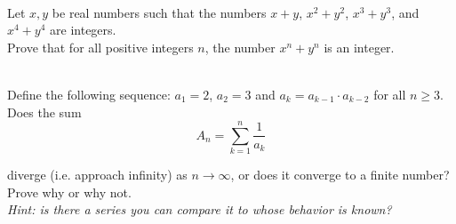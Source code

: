 \documentclass[11pt]{article}
\newif\ifsolutions
\begin{document}
\begin{qunlist}
\begin{itemize}
\ifsolutions
\textcolor{blue}{
\textbf{Solutions:} 
}
\fi

\end{itemize}



 \\
Let $x,y$ be real numbers such that the numbers $x+y$, $x^2+y^2$, $x^3+y^3$, and $x^4+y^4$ are integers. \\ 
Prove that for all positive integers $n$, the number $x^n + y^n$ is an integer.

\ifsolutions
\textbf{Solutions:}
Use strong induction. Use the identity
\[ x^{k+1} + y^{k+1} = (x+y)(x^k + y^k) - xy(x^{k-1} + y^{k-1}) \]

We are given that $x+y$ is an integer, and by our inductive hypothesis $x^k + y^k$ and $x^{k-1} + y^{k-1}$ 
are also both integers. So we need to show that $xy$ is an integer.  This can be shown because:
\[ x^3 + y^3 = (x+y)(x^2+y^2) - xy(x+y) \]

So our base cases are $n=5$ and $n=6$.  After that we can use strong induction.
\fi



 \\
Define the following sequence: $a_1 =2$, $a_2 = 3$ and $a_k = a_{k-1} \cdot a_{k-2}$ for all $n \geq 3$. \\ 
Does the sum 
\[ A_n = \sum_{k=1}^n \frac{1}{a_k} \]

diverge (i.e. approach infinity) as $n \to \infty$, or does it converge to a finite number?  
Prove why or why not.  \\
{\em Hint: is there a series you can compare it to whose behavior is known?}

\ifsolutions
\textbf{Solutions:}
It does converge. We can first use strong induction to prove the claim
\[ a_k > 2^k, \quad \forall k \geq 4 \] 

For the base cases we have $a_4 = a_3 \cdot a_2 = 6 \cdot 3 = 18 > 2^4$ 
and $a_5 = a_4 \cdot a_3 = 18 \cdot 6 = 108 > 2^5$. Then for the inductive step we have
\[ a_{k+1} = a_k \cdot a_{k-1} > 2^k \cdot 2^{k-1} = 2^{2k-1} > 2^{k+1} \]

Therefore:
\[ \sum_{k=4}^n \frac{1}{a_k} < \sum_{k=4}^n \frac{1}{2^k} \]

Since the RHS converges as $n \to \infty$, we know the LHS converges.  
Adding a constant (i.e. the first three terms) does not change the fact that it converges.
\fi




\end{qunlist}
\end{document}
